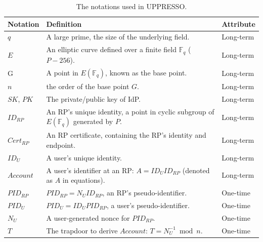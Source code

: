 \begin{table}[tb]
\scriptsize
    \caption{The notations used in UPPRESSO.}
    \centering
    \setlength{\tabcolsep}{1.2mm}
    \begin{tabular}{|p{1.12cm}|p{4.65cm}|p{1.7cm}|}
    \hline
    {\textbf{Notation}} & {\textbf{Definition}} & {\textbf{Attribute}} \\
    \hline
    {$q$} & {A large prime, the size of the underlying field.} & {Long-term} \\
    \hline
    {$E$}&{An elliptic curve defined over a finite field $\mathbb{F}_q$ ($P-256$).}&{Long-term}
     \\
    \hline
    {G}&{A point in $E(\mathbb{F}_q)$,  known as the base point.}&{Long-term}\\
    \hline
    {$n$} & {the order of the base point $G$.} & {Long-term} \\
    \hline
    {$SK$, $PK$} & {The private/public key of IdP. } & {Long-term} \\
    \hline
   {$ID_{RP}$} & {An RP's unique identity,  a point in cyclic subgroup of $E(\mathbb{F}_q)$ generated by $P$.} & {Long-term} \\
    \hline
    {$Cert_{RP}$} & {An RP certificate, containing the RP's identity and endpoint.} & {Long-term} \\
    \hline
    {$ID_U$} & {A user's unique identity.} & {Long-term} \\
    \hline
     {$Account$} & {A user's identifier at an RP: $A=  {ID_U}{ID_{RP}} $ (denoted as $A$ in equations).} & {Long-term} \\
    \hline
    {$PID_{RP}$} & {$PID_{RP} = {N_{U}}{ID_{RP}} $, an RP's pseudo-identifier.} & {One-time} \\
    \hline
    {$PID_U$} & {$PID_U = {ID_U}{PID_{RP}}$, a user's pseudo-identifier.} & {One-time}\\
    \hline
    {$N_U$} & {A user-generated nonce for $PID_{RP}$.} & {One-time} \\
    \hline
    {$T$} & {The trapdoor to derive $Account$: $T=N_U^{-1} \bmod n$.} & {One-time} \\
    \hline
    \end{tabular}
    \label{tbl:notations}
    \vspace{-5mm}
\end{table}


